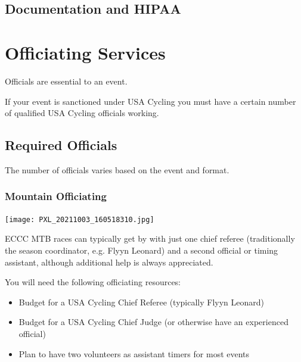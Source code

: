 \documentclass[
  letterpaper, %
  fontsize=10pt, %
  twoside=true,
  chapterentrydots=true, %
  numbers=noenddot,
  fontmethod=tex,
]{kaobook}
\begin{document}
\subsection{Documentation and HIPAA}

\section{Officiating Services}

Officials are essential to an event.

If your event is sanctioned %
under USA Cycling
you must have a certain number of qualified USA Cycling officials working.

\subsection{Required Officials}

The number of officials varies based on the event and format.

\subsubsection{Mountain Officiating}

\begin{marginfigure}
\texttt{[image: PXL\_20211003\_160518310.jpg]}
\caption[MTB STXC Finish Line]{
          A Short-Track Cross Country %
          finish line can be run with a very small crew.\\
          Credit: Katie Aman}
\end{marginfigure}

ECCC MTB races can typically get by with just one chief referee
(traditionally the season coordinator, e.g. Flyyn Leonard)
and a second official or timing assistant,
although additional help is always appreciated.

\begin{kaobox}[title=Note for Team-Hosted MTB Races]
You will need the following officiating resources:

\begin{itemize}
  \item Budget for a USA Cycling Chief Referee (typically Flyyn Leonard)
  \item Budget for a USA Cycling Chief Judge (or otherwise have an experienced official)
  \item Plan to have two volunteers as assistant timers for most events
\end{itemize}
\end{kaobox}
\end{document}
